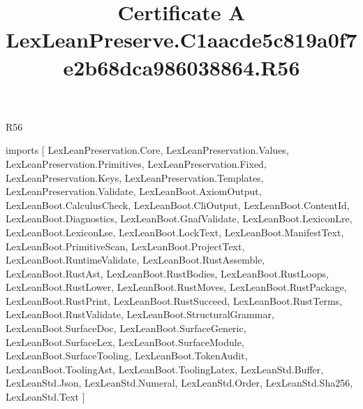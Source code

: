 \begin{lexlean}{R56}
\title{Certificate A LexLeanPreserve.C1aacde5c819a0f7e2b68dca986038864.R56}
\begin{coremodule}
imports [
  LexLeanPreservation.Core,
  LexLeanPreservation.Values,
  LexLeanPreservation.Primitives,
  LexLeanPreservation.Fixed,
  LexLeanPreservation.Keys,
  LexLeanPreservation.Templates,
  LexLeanPreservation.Validate,
  LexLeanBoot.AxiomOutput,
  LexLeanBoot.CalculusCheck,
  LexLeanBoot.CliOutput,
  LexLeanBoot.ContentId,
  LexLeanBoot.Diagnostics,
  LexLeanBoot.GnafValidate,
  LexLeanBoot.LexiconLre,
  LexLeanBoot.LexiconLse,
  LexLeanBoot.LockText,
  LexLeanBoot.ManifestText,
  LexLeanBoot.PrimitiveScan,
  LexLeanBoot.ProjectText,
  LexLeanBoot.RuntimeValidate,
  LexLeanBoot.RustAssemble,
  LexLeanBoot.RustAst,
  LexLeanBoot.RustBodies,
  LexLeanBoot.RustLoops,
  LexLeanBoot.RustLower,
  LexLeanBoot.RustMoves,
  LexLeanBoot.RustPackage,
  LexLeanBoot.RustPrint,
  LexLeanBoot.RustSucceed,
  LexLeanBoot.RustTerms,
  LexLeanBoot.RustValidate,
  LexLeanBoot.StructuralGrammar,
  LexLeanBoot.SurfaceDoc,
  LexLeanBoot.SurfaceGeneric,
  LexLeanBoot.SurfaceLex,
  LexLeanBoot.SurfaceModule,
  LexLeanBoot.SurfaceTooling,
  LexLeanBoot.TokenAudit,
  LexLeanBoot.ToolingAst,
  LexLeanBoot.ToolingLatex,
  LexLeanStd.Buffer,
  LexLeanStd.Json,
  LexLeanStd.Numeral,
  LexLeanStd.Order,
  LexLeanStd.Sha256,
  LexLeanStd.Text
]


\end{coremodule}
\end{lexlean}
